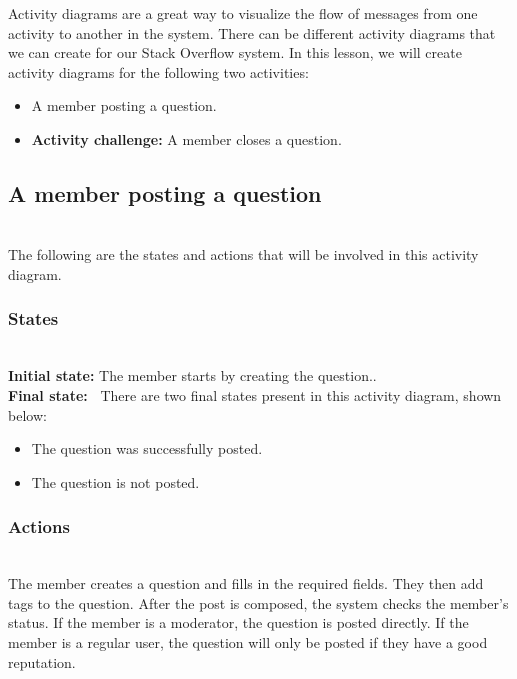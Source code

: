 

Activity diagrams are a great way to visualize the flow of messages from one activity to another in the system. There can be different activity diagrams that we can create for our Stack Overflow system. In this lesson, we will create activity diagrams for the following two activities:

\begin{itemize}
\item
\protect{}\label{ErjnXJPV4ZMBigqpjgSAa}
A member posting a question.
\item
\protect{}\label{LYKU1A32p9BgkPwTZPCIH}
\textbf{Activity challenge:} A member closes a question.
\end{itemize}

\subsection{A member posting a question}\label{t8OUGvzuq-H_fA-PVh6fP}
\\
The following are the states and actions that will be involved in this activity diagram.

\subsubsection{States}\label{YZ2fAzlLFiiVXBo6QeSRP}
\\
\textbf{Initial state:} The member starts by creating the question..
\\
\textbf{Final state:~} There are two final states present in this activity diagram, shown below:

\begin{itemize}
\item
\protect{}\label{YNemG7BV2HUfu76QUPBmh}
The question was successfully posted.
\item
\protect{}\label{gFmXhl4_TLEHHg9dQsBNP}
The question is not posted.
\end{itemize}

\subsubsection{Actions}\label{Xo1kTeURAEXIHbSsnHxEY}
\\
The member creates a question and fills in the required fields. They then add tags to the question. After the post is composed, the system checks the member's status. If the member is a moderator, the question is posted directly. If the member is a regular user, the question will only be posted if they have a good reputation.

